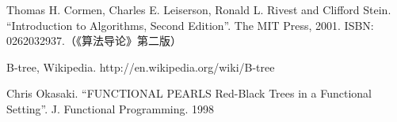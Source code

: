 \documentclass{ctexart}
\begin{document}
\ifx\wholebook\relax \else
\begin{thebibliography}{99}

Thomas H. Cormen, Charles E. Leiserson, Ronald L. Rivest and Clifford Stein. ``Introduction to Algorithms, Second Edition''. The MIT Press, 2001. ISBN: 0262032937.（《算法导论》第二版）

B-tree, Wikipedia. http://en.wikipedia.org/wiki/B-tree

Chris Okasaki. ``FUNCTIONAL PEARLS Red-Black Trees in a Functional Setting''. J. Functional Programming. 1998

\end{thebibliography}
\end{document}
